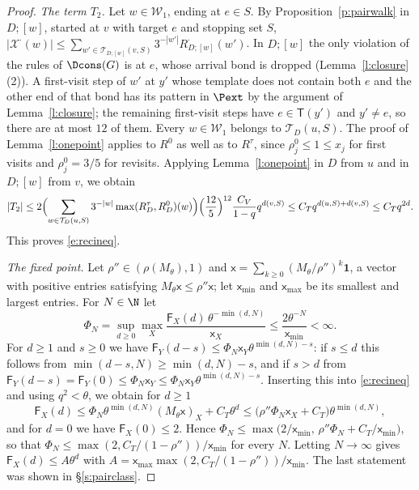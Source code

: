 \begin{proof}
\emph{The term $T_2$.} Let $w \in \mathcal W_1$, ending at $e \in S$. By Proposition~\ref{p:pairwalk} in $D;[w]$, started at $v$ with target $e$ and stopping set $S$, $|\mathcal X^\cdot(w)| \le \sum_{w' \in \mathcal T_{D;[w]}(v, S)} 3^{-|w'|} R^\cdot_{D;[w]}(w')$. In $D;[w]$ the only violation of the rules of $\Dcons(G)$ is at $e$, whose arrival bond is dropped (Lemma~\ref{l:closure}(2)). A first-visit step of $w'$ at $y'$ whose template does not contain both $e$ and the other end of that bond has its pattern in $\Pext$ by the argument of Lemma~\ref{l:closure}; the remaining first-visit steps have $e \in \mathsf T(y')$ and $y' \neq e$, so there are at most $12$ of them. Every $w \in \mathcal W_1$ belongs to $\mathcal T_D(u, S)$. The proof of Lemma~\ref{l:onepoint} applies to $R^0$ as well as to $R^\tau$, since $\rho^0_j \le 1 \le x_j$ for first visits and $\rho^0_j = 3/5$ for revisits. Applying Lemma~\ref{l:onepoint} in $D$ from $u$ and in $D;[w]$ from $v$, we obtain
\begin{equation*}
|T_2| \le 2 \Bigl( \sum_{w \in \mathcal T_D(u, S)} 3^{-|w|} \max(R^\tau_D, R^0_D)(w) \Bigr) \Bigl( \frac{12}{5} \Bigr)^{12} \frac{C_V}{1 - q} q^{d(v, S)} \le C_T q^{d(u, S) + d(v, S)} \le C_T q^{2d} .
\end{equation*}
This proves \eqref{e:recineq}.

\emph{The fixed point.} Let $\rho'' \in (\rho(M_\theta), 1)$ and $\mathsf x = \sum_{k \ge 0} (M_\theta/\rho'')^k \mathbf 1$, a vector with positive entries satisfying $M_\theta \mathsf x \le \rho'' \mathsf x$; let $\mathsf x_{\min}$ and $\mathsf x_{\max}$ be its smallest and largest entries. For $N \in \N$ let
\begin{equation*}
\Phi_N = \sup_{d \ge 0} \max_{X} \frac{\mathsf F_X(d) \, \theta^{-\min(d, N)}}{\mathsf x_X} \le \frac{2 \theta^{-N}}{\mathsf x_{\min}} < \infty .
\end{equation*}
For $d \ge 1$ and $s \ge 0$ we have $\mathsf F_Y(d - s) \le \Phi_N \mathsf x_Y \theta^{\min(d, N) - s}$: if $s \le d$ this follows from $\min(d - s, N) \ge \min(d, N) - s$, and if $s > d$ from $\mathsf F_Y(d - s) = \mathsf F_Y(0) \le \Phi_N \mathsf x_Y \le \Phi_N \mathsf x_Y \theta^{\min(d, N) - s}$. Inserting this into \eqref{e:recineq} and using $q^2 < \theta$, we obtain for $d \ge 1$
\begin{equation*}
\mathsf F_X(d) \le \Phi_N \theta^{\min(d, N)} (M_\theta \mathsf x)_X + C_T \theta^{d} \le \bigl( \rho'' \Phi_N \mathsf x_X + C_T \bigr) \theta^{\min(d, N)} ,
\end{equation*}
and for $d = 0$ we have $\mathsf F_X(0) \le 2$. Hence $\Phi_N \le \max\bigl( 2/\mathsf x_{\min}, \, \rho'' \Phi_N + C_T / \mathsf x_{\min} \bigr)$, so that $\Phi_N \le \max(2, C_T/(1 - \rho''))/\mathsf x_{\min}$ for every $N$. Letting $N \to \infty$ gives $\mathsf F_X(d) \le A \theta^d$ with $A = \mathsf x_{\max} \max(2, C_T / (1 - \rho''))/\mathsf x_{\min}$. The last statement was shown in \S\ref{s:pairclass}.
\end{proof}

